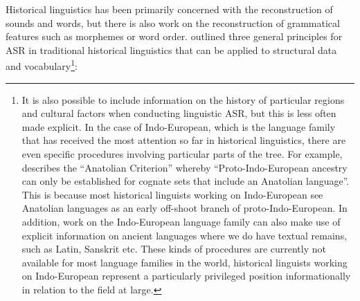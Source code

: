 \documentclass[12pt,letterpaper]{article}
\begin{document}





Historical linguistics has been primarily concerned with the reconstruction of sounds and words, but there is also work on the reconstruction of grammatical features such as morphemes or word order. \citet[17-22]{clark1973aspects} outlined three general principles for ASR in traditional historical linguistics that can be applied to structural data and vocabulary\footnote{It is also possible to include information on the history of particular regions and cultural factors when conducting linguistic ASR, but this is less often made explicit. In the case of Indo-European, which is the language family that has received the most attention so far in historical linguistics, there are even specific procedures involving particular parts of the tree. For example, \citet[6]{goldstein_2022} describes the ``Anatolian Criterion'' whereby ``Proto-Indo-European ancestry can only be established for cognate sets that include an Anatolian language''. This is because most historical linguists working on Indo-European see Anatolian languages as an early off-shoot branch of proto-Indo-European. In addition, work on the Indo-European language family can also make use of explicit information on ancient languages where we do have textual remains, such as Latin, Sanskrit etc. These kinds of procedures are currently not available for most language families in the world, historical linguists working on Indo-European represent a particularly privileged position informationally in relation to the field at large.}:
\end{document}
